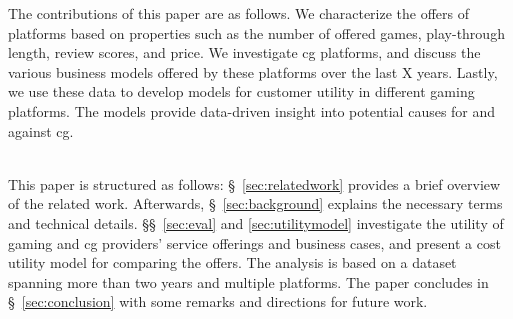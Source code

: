 
The contributions of this paper are as follows.
We characterize the offers of platforms based on properties such
as the number of offered games, play-through length, review scores,
and price.
We investigate \gls{cg} platforms, and discuss the various
business models offered by these platforms over the last X years.
Lastly, we use these data to develop models for customer utility
in different gaming platforms. The models provide data-driven
insight into potential causes for and against \gls{cg}.


~\\
This paper is structured as follows: §~\ref{sec:relatedwork} provides a
brief overview of the related work. Afterwards, §~\ref{sec:background}
explains the necessary terms and technical details.
§§~\ref{sec:eval} and \ref{sec:utilitymodel} investigate the utility of
gaming and \gls{cg} providers' service offerings and business cases,
and present a cost utility model for comparing the offers.
The analysis is based on a dataset spanning more than two years and
multiple platforms.
The paper concludes in §~\ref{sec:conclusion} with some
remarks and directions for future work.



